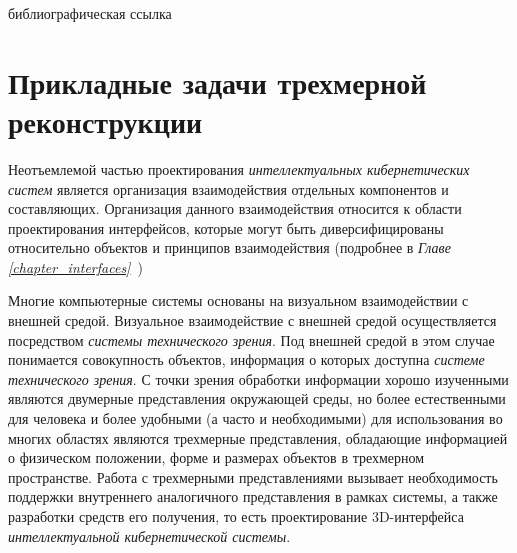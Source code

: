 \begin{SCn}
    \bigskip

    \begin{scnrelfromlist}{библиографическая ссылка}
    \end{scnrelfromlist}

\end{SCn}

\section{Прикладные задачи трехмерной реконструкции}
\label{sec_3d_models_problems}

Неотъемлемой частью проектирования \textit{интеллектуальных кибернетических систем} является организация взаимодействия отдельных компонентов и составляющих. Организация данного взаимодействия относится к области проектирования интерфейсов, которые могут быть диверсифицированы относительно объектов и принципов взаимодействия (подробнее в \textit{Главе \ref{chapter_interfaces}~})

Многие компьютерные системы основаны на визуальном взаимодействии с внешней средой. Визуальное взаимодействие с внешней средой осуществляется посредством \textit{системы технического зрения}. Под внешней средой в этом случае понимается совокупность объектов, информация о которых доступна \textit{системе технического зрения}. С точки зрения обработки информации хорошо изученными являются двумерные представления окружающей среды, но более естественными для человека и более удобными (а часто и необходимыми) для использования во многих областях являются трехмерные представления, обладающие информацией о физическом положении, форме и размерах объектов в трехмерном пространстве. Работа с трехмерными представлениями вызывает необходимость поддержки внутреннего аналогичного представления в рамках системы, а также разработки средств его получения, то есть проектирование 3D-интерфейса \textit{интеллектуальной кибернетической системы}.

